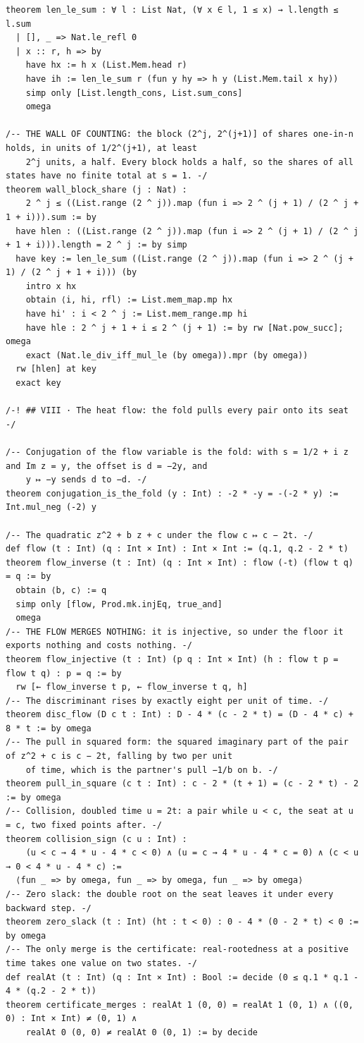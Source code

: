 \documentclass[10pt,twocolumn]{article}
\begin{document}
\begin{Verbatim}
theorem len_le_sum : ∀ l : List Nat, (∀ x ∈ l, 1 ≤ x) → l.length ≤ l.sum
  | [], _ => Nat.le_refl 0
  | x :: r, h => by
    have hx := h x (List.Mem.head r)
    have ih := len_le_sum r (fun y hy => h y (List.Mem.tail x hy))
    simp only [List.length_cons, List.sum_cons]
    omega

/-- THE WALL OF COUNTING: the block (2^j, 2^(j+1)] of shares one-in-n holds, in units of 1/2^(j+1), at least
    2^j units, a half. Every block holds a half, so the shares of all states have no finite total at s = 1. -/
theorem wall_block_share (j : Nat) :
    2 ^ j ≤ ((List.range (2 ^ j)).map (fun i => 2 ^ (j + 1) / (2 ^ j + 1 + i))).sum := by
  have hlen : ((List.range (2 ^ j)).map (fun i => 2 ^ (j + 1) / (2 ^ j + 1 + i))).length = 2 ^ j := by simp
  have key := len_le_sum ((List.range (2 ^ j)).map (fun i => 2 ^ (j + 1) / (2 ^ j + 1 + i))) (by
    intro x hx
    obtain ⟨i, hi, rfl⟩ := List.mem_map.mp hx
    have hi' : i < 2 ^ j := List.mem_range.mp hi
    have hle : 2 ^ j + 1 + i ≤ 2 ^ (j + 1) := by rw [Nat.pow_succ]; omega
    exact (Nat.le_div_iff_mul_le (by omega)).mpr (by omega))
  rw [hlen] at key
  exact key

/-! ## VIII · The heat flow: the fold pulls every pair onto its seat -/

/-- Conjugation of the flow variable is the fold: with s = 1/2 + i z and Im z = y, the offset is d = −2y, and
    y ↦ −y sends d to −d. -/
theorem conjugation_is_the_fold (y : Int) : -2 * -y = -(-2 * y) := Int.mul_neg (-2) y

/-- The quadratic z^2 + b z + c under the flow c ↦ c − 2t. -/
def flow (t : Int) (q : Int × Int) : Int × Int := (q.1, q.2 - 2 * t)
theorem flow_inverse (t : Int) (q : Int × Int) : flow (-t) (flow t q) = q := by
  obtain ⟨b, c⟩ := q
  simp only [flow, Prod.mk.injEq, true_and]
  omega
/-- THE FLOW MERGES NOTHING: it is injective, so under the floor it exports nothing and costs nothing. -/
theorem flow_injective (t : Int) (p q : Int × Int) (h : flow t p = flow t q) : p = q := by
  rw [← flow_inverse t p, ← flow_inverse t q, h]
/-- The discriminant rises by exactly eight per unit of time. -/
theorem disc_flow (D c t : Int) : D - 4 * (c - 2 * t) = (D - 4 * c) + 8 * t := by omega
/-- The pull in squared form: the squared imaginary part of the pair of z^2 + c is c − 2t, falling by two per unit
    of time, which is the partner's pull −1/b on b. -/
theorem pull_in_square (c t : Int) : c - 2 * (t + 1) = (c - 2 * t) - 2 := by omega
/-- Collision, doubled time u = 2t: a pair while u < c, the seat at u = c, two fixed points after. -/
theorem collision_sign (c u : Int) :
    (u < c → 4 * u - 4 * c < 0) ∧ (u = c → 4 * u - 4 * c = 0) ∧ (c < u → 0 < 4 * u - 4 * c) :=
  ⟨fun _ => by omega, fun _ => by omega, fun _ => by omega⟩
/-- Zero slack: the double root on the seat leaves it under every backward step. -/
theorem zero_slack (t : Int) (ht : t < 0) : 0 - 4 * (0 - 2 * t) < 0 := by omega
/-- The only merge is the certificate: real-rootedness at a positive time takes one value on two states. -/
def realAt (t : Int) (q : Int × Int) : Bool := decide (0 ≤ q.1 * q.1 - 4 * (q.2 - 2 * t))
theorem certificate_merges : realAt 1 (0, 0) = realAt 1 (0, 1) ∧ ((0, 0) : Int × Int) ≠ (0, 1) ∧
    realAt 0 (0, 0) ≠ realAt 0 (0, 1) := by decide


\end{Verbatim}
\end{document}
